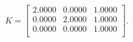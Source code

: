 \begin{equation*}
K = 
\begin{bmatrix}
  2.0000 &   0.0000 &   1.0000 \\
  0.0000 &   2.0000 &   1.0000 \\
  0.0000 &   0.0000 &   1.0000 \\
\end{bmatrix}.
\end{equation*}

